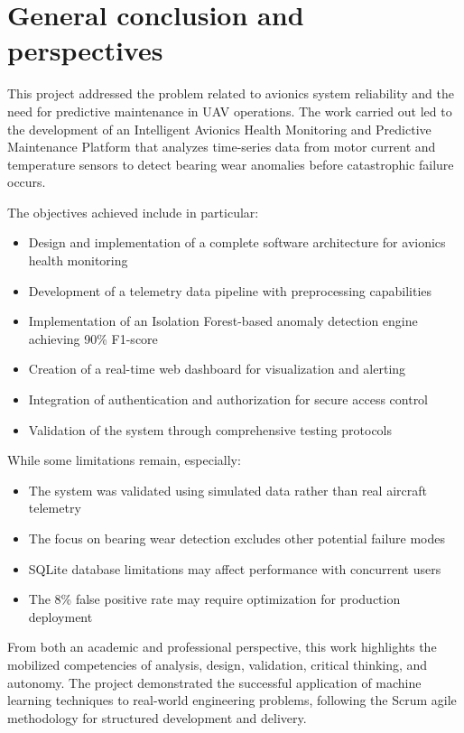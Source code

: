 \chapter*{General conclusion and perspectives}

This project addressed the problem related to avionics system reliability and the need for predictive maintenance in UAV operations. The work carried out led to the development of an Intelligent Avionics Health Monitoring and Predictive Maintenance Platform that analyzes time-series data from motor current and temperature sensors to detect bearing wear anomalies before catastrophic failure occurs.

The objectives achieved include in particular:
\begin{itemize}
    \item Design and implementation of a complete software architecture for avionics health monitoring
    \item Development of a telemetry data pipeline with preprocessing capabilities
    \item Implementation of an Isolation Forest-based anomaly detection engine achieving 90\% F1-score
    \item Creation of a real-time web dashboard for visualization and alerting
    \item Integration of authentication and authorization for secure access control
    \item Validation of the system through comprehensive testing protocols
\end{itemize}

While some limitations remain, especially:
\begin{itemize}
    \item The system was validated using simulated data rather than real aircraft telemetry
    \item The focus on bearing wear detection excludes other potential failure modes
    \item SQLite database limitations may affect performance with concurrent users
    \item The 8\% false positive rate may require optimization for production deployment
\end{itemize}

From both an academic and professional perspective, this work highlights the mobilized competencies of analysis, design, validation, critical thinking, and autonomy. The project demonstrated the successful application of machine learning techniques to real-world engineering problems, following the Scrum agile methodology for structured development and delivery.

